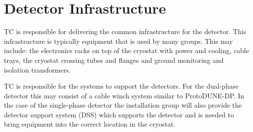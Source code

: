 \section{Detector Infrastructure}
\label{sec:fdsp-coord-infrastructure}

TC is responsible for delivering the common infrastructure
for the detector. This infrastructure is typically
equipment that is used by many groups. This may include: the
electronics racks on top of the cryostat with power and cooling, cable trays, the cryostat
crossing tubes and flanges and ground
monitoring and isolation transformers.

TC is responsible for the systems to support the detectors. For the
dual-phase detector this may consist of a cable winch system similar
to ProtoDUNE-DP.  In the case of the single-phase detector the
installation group will also provide the detector support system (DSS)
which supports the detector and is needed to bring equipment into the
correct location in the cryostat.


